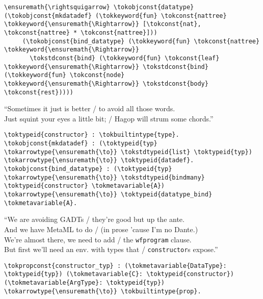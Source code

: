 \vspace{-0.9em}

\begin{verbatim}
\ensuremath{\rightsquigarrow} \tokobjconst{datatype} (\tokobjconst{mkdatadef} (\tokkeyword{fun} \tokconst{nattree} \tokkeyword{\ensuremath{\Rightarrow}} [\tokconst{nat}, \tokconst{nattree} * \tokconst{nattree}]))
     (\tokobjconst{bind_datatype} (\tokkeyword{fun} \tokconst{nattree} \tokkeyword{\ensuremath{\Rightarrow}}
       \tokstdconst{bind} (\tokkeyword{fun} \tokconst{leaf} \tokkeyword{\ensuremath{\Rightarrow}} \tokstdconst{bind} (\tokkeyword{fun} \tokconst{node} \tokkeyword{\ensuremath{\Rightarrow}} \tokstdconst{body} \tokconst{rest}))))
\end{verbatim}

\begin{versy}
``Sometimes it just is better / to avoid all those words. \\
Just squint your eyes a little bit; / Hagop will strum some chords.''
\end{versy}

\begin{verbatim}
\toktypeid{constructor} : \tokbuiltintype{type}.
\tokobjconst{mkdatadef} : (\toktypeid{typ} \tokarrowtype{\ensuremath{\to}} \tokstdtypeid{list} \toktypeid{typ}) \tokarrowtype{\ensuremath{\to}} \toktypeid{datadef}.
\tokobjconst{bind_datatype} : (\toktypeid{typ} \tokarrowtype{\ensuremath{\to}} \tokstdtypeid{bindmany} \toktypeid{constructor} \tokmetavariable{A}) \tokarrowtype{\ensuremath{\to}} \toktypeid{datatype_bind} \tokmetavariable{A}.
\end{verbatim}

\begin{versy}
``We are avoiding GADTs / they're good but up the ante. \\
And we have MetaML to do / (in prose 'cause I'm no Dante.) \\
We're almost there, we need to add / the \texttt{wfprogram} clause. \\
But first we'll need an env. with types that / \texttt{constructor}s expose.''
\end{versy}

\begin{verbatim}
\tokpropconst{constructor_typ} : (\tokmetavariable{DataType}: \toktypeid{typ}) (\tokmetavariable{C}: \toktypeid{constructor}) (\tokmetavariable{ArgType}: \toktypeid{typ}) \tokarrowtype{\ensuremath{\to}} \tokbuiltintype{prop}.
\end{verbatim}

